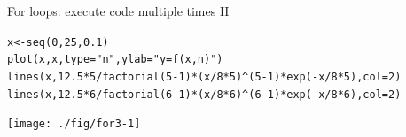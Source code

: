 \documentclass[xcolor=table,       handout,    xcolor=dvipsnames]{beamer}\usepackage[]{graphicx}\usepackage[]{color}
\makeatletter
\newcommand{\hlnum}[1]{\textcolor[rgb]{0,0,0}{#1}}
\newcommand{\hlstr}[1]{\textcolor[rgb]{0.545,0.137,0.137}{#1}}
\newcommand{\hlopt}[1]{\textcolor[rgb]{0,0,0}{#1}}
\newcommand{\hlstd}[1]{\textcolor[rgb]{0,0,0}{#1}}
\newcommand{\hlkwb}[1]{\textcolor[rgb]{0,0,0}{#1}}
\newcommand{\hlkwc}[1]{\textcolor[rgb]{1,0,1}{#1}}
\newcommand{\hlkwd}[1]{\textcolor[rgb]{0,0,1}{#1}}
\newenvironment{kframe}{%
 \def\at@end@of@kframe{}%
 \ifinner\ifhmode%
  \def\at@end@of@kframe{\end{minipage}}%
  \begin{minipage}{\columnwidth}%
 \fi\fi%
 \def\FrameCommand##1{\hskip\@totalleftmargin \hskip-\fboxsep
 \colorbox{shadecolor}{##1}\hskip-\fboxsep
     \hskip-\linewidth \hskip-\@totalleftmargin \hskip\columnwidth}%
 \MakeFramed {\advance\hsize-\width
   \@totalleftmargin\z@ \linewidth\hsize
   \@setminipage}}%
 {\par\unskip\endMakeFramed%
 \at@end@of@kframe}
\newenvironment{knitrout}{}{} %
\makeatother
\begin{document}
\begin{frame}[fragile]{For loops: execute code multiple times II}
\begin{knitrout}\footnotesize
{}\color{fgcolor}\begin{kframe}
\begin{alltt}
\hlstd{x} \hlkwb{<-} \hlkwd{seq}\hlstd{(}\hlnum{0}\hlstd{,}\hlnum{25}\hlstd{,}\hlnum{0.1}\hlstd{)}
\hlkwd{plot}\hlstd{(x,x,} \hlkwc{type}\hlstd{=}\hlstr{"n"}\hlstd{,} \hlkwc{ylab}\hlstd{=}\hlstr{"y = f(x,n)"}\hlstd{)}
\hlkwd{lines}\hlstd{(x,} \hlnum{12.5}\hlopt{*}\hlnum{5}\hlopt{/}\hlkwd{factorial}\hlstd{(}\hlnum{5}\hlopt{-}\hlnum{1}\hlstd{)}\hlopt{*}\hlstd{(x}\hlopt{/}\hlnum{8}\hlopt{*}\hlnum{5}\hlstd{)}\hlopt{^}\hlstd{(}\hlnum{5}\hlopt{-}\hlnum{1}\hlstd{)}\hlopt{*}\hlkwd{exp}\hlstd{(}\hlopt{-}\hlstd{x}\hlopt{/}\hlnum{8}\hlopt{*}\hlnum{5}\hlstd{),} \hlkwc{col}\hlstd{=}\hlnum{2}\hlstd{)}
\hlkwd{lines}\hlstd{(x,} \hlnum{12.5}\hlopt{*}\hlnum{6}\hlopt{/}\hlkwd{factorial}\hlstd{(}\hlnum{6}\hlopt{-}\hlnum{1}\hlstd{)}\hlopt{*}\hlstd{(x}\hlopt{/}\hlnum{8}\hlopt{*}\hlnum{6}\hlstd{)}\hlopt{^}\hlstd{(}\hlnum{6}\hlopt{-}\hlnum{1}\hlstd{)}\hlopt{*}\hlkwd{exp}\hlstd{(}\hlopt{-}\hlstd{x}\hlopt{/}\hlnum{8}\hlopt{*}\hlnum{6}\hlstd{),} \hlkwc{col}\hlstd{=}\hlnum{2}\hlstd{)}
\end{alltt}
\end{kframe}

{\centering \texttt{[image: ./fig/for3-1]} 

}



\end{knitrout}
\end{frame}
\end{document}
